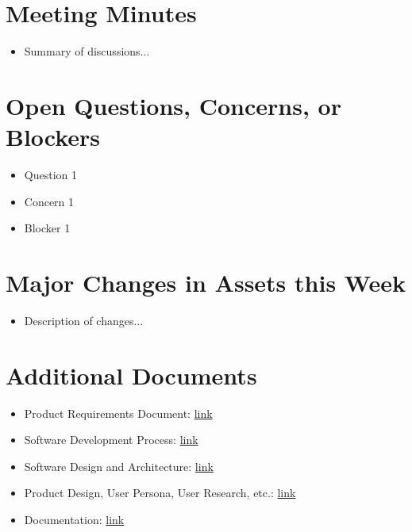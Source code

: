 \documentclass{article}
\begin{document}
\section*{Meeting Minutes}
\begin{itemize}[label={--}]
    \item Summary of discussions...
\end{itemize}

\section*{Open Questions, Concerns, or Blockers}
\begin{itemize}[label={--}]
    \item Question 1
    \item Concern 1
    \item Blocker 1
\end{itemize}

\section*{Major Changes in Assets this Week}
\begin{itemize}[label={--}]
    \item Description of changes...
\end{itemize}

\section*{Additional Documents}
\begin{itemize}[label={--}]
    \item Product Requirements Document: \url{link}
    \item Software Development Process: \url{link}
    \item Software Design and Architecture: \url{link}
    \item Product Design, User Persona, User Research, etc.: \url{link}
    \item Documentation: \url{link}
\end{itemize}
\end{document}
